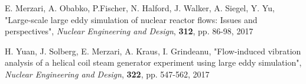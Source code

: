 \documentclass[11pt,letterpaper,english]{article}
\begin{document}
E. Merzari, A. Obabko, P.Fischer, N. Halford, J. Walker, A. Siegel, Y. Yu, "Large-scale large eddy simulation of nuclear reactor flows: Issues and perspectives", \textit{Nuclear Engineering and Design}, \textbf{312}, pp. 86-98, 2017

H. Yuan, J. Solberg, E. Merzari, A. Kraus, I. Grindeanu, "Flow-induced vibration analysis of a helical coil steam generator experiment using large eddy simulation", \textit{Nuclear Engineering and Design}, \textbf{322}, pp. 547-562, 2017





\end{document}
